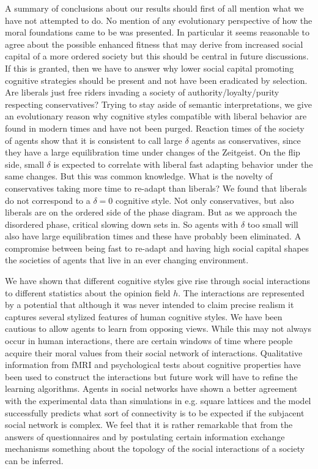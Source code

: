 \documentclass[twocolumn,showpacs]{revtex4-1}
\begin{document}
A summary of conclusions about our results should first of
all mention what we have not attempted to do. 
 No mention of any evolutionary
perspective of how the  moral foundations came to be
was presented. In particular it seems reasonable to agree about
the possible enhanced fitness that may derive from increased social 
capital of a more ordered society but
this   should be central in future discussions. If this is granted, then
we have to answer why lower social capital promoting cognitive
strategies should be present and not have been eradicated by selection.
Are liberals just free riders invading a society of authority/loyalty/purity
respecting conservatives? Trying to stay aside of semantic interpretations, 
we give an evolutionary reason why cognitive styles compatible 
with liberal behavior are found in modern times and 
have not been purged. 
Reaction times of the society of agents show that it is consistent
to call large $\delta $ agents as conservatives, since they
have a large equilibration time under changes of the Zeitgeist. 
On the flip side, small $\delta$ is expected to correlate with 
liberal fast adapting behavior under the same changes. But
this was common knowledge. 
What is the novelty of conservatives taking more
time to re-adapt than liberals? We found that liberals do not correspond
to a $\delta=0$ cognitive style. Not only conservatives, but also
liberals are on the ordered side of the phase diagram. But
as we approach the disordered phase, critical slowing down sets in. So
agents with $\delta$ too small will also have large equilibration
times and these have probably been eliminated.
 A compromise between being fast to re-adapt and having
high social capital shapes the societies of agents that live in an
ever changing environment.

We have shown that different cognitive styles give rise through 
social interactions to different statistics about the opinion field $h$.  
The interactions are represented by a potential
that although it was never intended to claim precise realism 
it captures several stylized features of human cognitive styles. 
We have been cautious to allow agents to learn from opposing views. 
While this may not always occur in human interactions, there 
are certain windows of time where people acquire their moral values
from their social network of interactions. 
Qualitative information from fMRI and psychological 
tests about cognitive properties have been used to construct 
the interactions but future work will have to refine
the learning algorithms. Agents in social networks have shown 
a better agreement with the experimental data than simulations
in e.g. square lattices and the model  successfully  predicts what sort of connectivity
 is to be expected if the subjacent social network is  complex.   We feel that it is rather remarkable that from 
the answers of questionnaires and by postulating certain information
exchange mechanisms something about the topology of 
the social interactions of a society can be inferred. 
\end{document}
